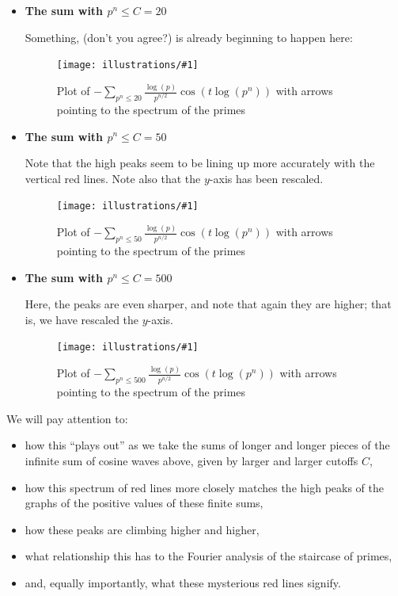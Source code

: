 \documentclass[openany]{book}
\newcommand{\ill}[3]{%
   \begin{figure}[H]%
   \vspace{-2ex}
   \centering%
   \texttt{[image: illustrations/\#1]}%
   \caption{#3}%
   \vspace{-2ex}
    \end{figure}}
\theoremstyle{plain}
\theoremstyle{definition}
\begin{document}
\begin{enumerate}
\begin{itemize}
Here is the function $f(t)$ we displayed above; it consists in the sum of the first four terms of our infinite sum, and doesn't yet show very much ``structure'':

\ill{phihat_even-5}{1}{Plot of $-\sum_{p^n\leq 5}{\frac{\log(p)}{p^{n/2}}}\cos(t\log(p^n))$ with
arrows pointing to the spectrum of the primes\label{fig:pnsum5}}\vskip20pt
\item {\bf The sum with $p^n \le C=20$} 

 Something,
 (don't you agree?)  is already beginning to happen here:
\ill{phihat_even-20}{1}{Plot of $-\sum_{p^n\leq 20}{\frac{\log(p)}{p^{n/2}}}\cos(t\log(p^n))$ with arrows pointing to the spectrum of the primes}\vskip20pt
\item {\bf The sum with $p^n \le C=50$} 

  Note that the high peaks seem to be lining up more accurately with
  the vertical red lines. Note also that the $y$-axis has been
  rescaled.

\ill{phihat_even-50}{1}{Plot of $-\sum_{p^n\leq 50}{\frac{\log(p)}{p^{n/2}}}\cos(t\log(p^n))$ with arrows pointing to the spectrum of the primes}\vskip20pt
\item {\bf The sum with $p^n \le C=500$}

  Here, the peaks are even sharper, and note that again they are
  higher; that is, we have rescaled the $y$-axis.
  \ill{phihat_even-500}{1}{Plot of $-\sum_{p^n\leq
      500}{\frac{\log(p)}{p^{n/2}}}\cos(t\log(p^n))$ with arrows
    pointing to the spectrum of the primes\label{fig:pnsum500}}
\end{itemize}

  We will pay attention to:

\begin{itemize} 
\item how this ``plays out'' as we take the sums of longer and longer
  pieces of the infinite sum of cosine waves above, given by larger
  and larger cutoffs $C$,
\item how this spectrum of red lines more closely matches the high
  peaks of the graphs of the positive values of these finite sums,
\item how these peaks are climbing higher and higher,
\item what relationship this has to the Fourier analysis of the
  staircase of primes,
\item and, equally importantly, what these mysterious red lines
  signify.
\end{itemize}


\end{enumerate}
\end{document}
